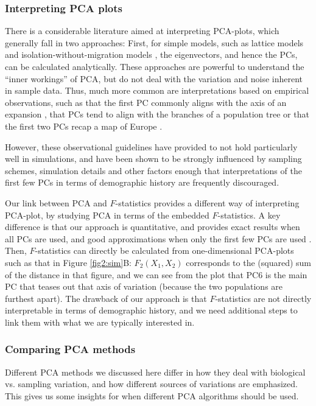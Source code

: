 \documentclass[12pt]{article}
\begin{document}
\subsubsection{Interpreting PCA plots}
There is a considerable literature aimed at interpreting PCA-plots, which generally fall in two approaches: First, for simple models, such as lattice models \citep{novembre_interpreting_2008} and isolation-without-migration models \citep{mcvean_genealogical_2009}, the eigenvectors, and hence the PCs, can be calculated analytically. These approaches are powerful to understand the ``inner workings'' of PCA, but do not deal with the variation and noise inherent in sample data. Thus, much more common are interpretations based on empirical observations, such as that the first PC commonly aligns with the axis of an expansion \citep{l_l_cavalli-sforza_history_1996}, that PCs tend to align with the branches of a population tree or that the first two PCs recap a map of Europe \citep{novembre_genes_2008, cavalli-sforza_analysis_1975}.

However, these observational guidelines have provided to not hold particularly well in simulations, and have been shown to be strongly influenced by sampling schemes, simulation details and other factors \citep{novembre_interpreting_2008, degiorgio_geographic_2013, elhaik_principal_2022, jay_anisotropic_2013} enough that interpretations of the first few PCs in terms of demographic history are frequently discouraged.

Our link between PCA and $F$-statistics provides a different way of interpreting PCA-plot, by studying PCA in terms of the embedded $F$-statistics. A key difference is that our approach is quantitative, and provides exact results when  all PCs are used, and good approximations when only the first few PCs are used \citep{peter_geometric_2022}. Then, $F$-statistics can directly be calculated from one-dimensional PCA-plots such as that in Figure \ref{fig2:sim}B: $F_2(X_1, X_2)$ corresponds to the (squared) sum of the distance in that figure, and we can see from the plot that PC6 is the main PC that teases out that axis of variation (because the two populations are furthest apart).  
The drawback of our approach is that $F$-statistics are not directly interpretable in terms of demographic history, and we need additional steps to link them with what we are typically interested in. 

\subsubsection{Comparing PCA methods}\label{compare_pca_discussion}
Different PCA methods we discussed here differ in how they deal with biological vs. sampling variation, and how different sources of variations are emphasized. This gives us some insights for when different PCA algorithms should be used. 
\end{document}

